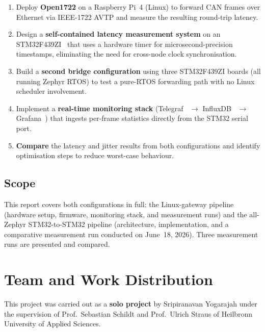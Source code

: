\documentclass[11pt,a4paper]{article}
\begin{document}
\begin{enumerate}
    \item Deploy \textbf{Open1722} on a Raspberry Pi~4 (Linux) to forward CAN frames over
          Ethernet via IEEE-1722 AVTP and measure the resulting round-trip latency.
    \item Design a \textbf{self-contained latency measurement system} on an
          STM32F439ZI~\cite{stm32rm} that uses a hardware timer for microsecond-precision
          timestamps, eliminating the need for cross-node clock synchronisation.
    \item Build a \textbf{second bridge configuration} using three STM32F439ZI boards
          (all running Zephyr RTOS) to test a pure-RTOS forwarding path with no Linux
          scheduler involvement.
    \item Implement a \textbf{real-time monitoring stack}
          (Telegraf~\cite{telegraf} $\rightarrow$ InfluxDB~\cite{influxdb} $\rightarrow$
          Grafana~\cite{grafana}) that ingests per-frame statistics directly from the
          STM32 serial port.
    \item \textbf{Compare} the latency and jitter results from both configurations and
          identify optimisation steps to reduce worst-case behaviour.
\end{enumerate}

\subsection{Scope}

This report covers both configurations in full: the Linux-gateway pipeline (hardware setup,
firmware, monitoring stack, and measurement runs) and the all-Zephyr STM32-to-STM32
pipeline (architecture, implementation, and a comparative measurement run conducted on
June~18, 2026).  Three measurement runs are presented and compared.

\section{Team and Work Distribution}
\label{sec:team}

This project was carried out as a \textbf{solo project} by Sripiranavan Yogarajah under
the supervision of Prof.\ Sebastian Schildt and Prof.\ Ulrich Straus of Heilbronn
University of Applied Sciences.
\end{document}

